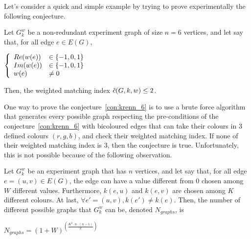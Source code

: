 Let's consider a quick and simple example by trying to prove experimentally the following conjecture.

\begin{conjecture}
    \label{con:krenn_6}
    Let $G_k^w$ be a non-redundant experiment graph of size $n = 6$ vertices, and let say that, for all edge $e \in E(G)$,
    \begin{center}
        $\left\{\begin{array}{l l}
            Re(w(e)) & \in \{-1, 0, 1\} \\
            Im(w(e)) & \in \{-1, 0, 1\} \\
            w(e)     & \neq 0          \\
        \end{array}\right.$
    \end{center}
    Then, the weighted matching index $\Tilde{c}(G, k, w) \leq 2$.
\end{conjecture}

One way to prove the conjecture~\ref{con:krenn_6} is to use a brute force algorithm that generates every possible graph respecting the pre-conditions of the conjecture~\ref{con:krenn_6} with bicoloured edges that can take their colours in $3$ defined colours $(r, g, b)$, and check their weighted matching index.
If none of their weighted matching index is $3$, then the conjecture is true.
Unfortunately, this is not possible because of the following observation.\\

\begin{observation}
    Let $G_k^w$ be an experiment graph that has $n$ vertices, and let say that, for all edge $e = (u, v) \in E(G)$, the edge can have a value different from $0$ chosen among $W$ different values.
    Furthermore, $k(e, u)$ and $k(e, v)$ are chosen among $K$ different colours.
    At last, $\forall e' = (u, v), k(e') \neq k(e)$.
    Then, the number of different possible graphs that $G_k^w$ can be, denoted $N_{graphs}$, is

    \begin{center}
        $N_{graphs} = (1 + W)^{\left(\frac{K^2 \cdot n \cdot (n-1)}{2}\right)}$
    \end{center}
\end{observation}



